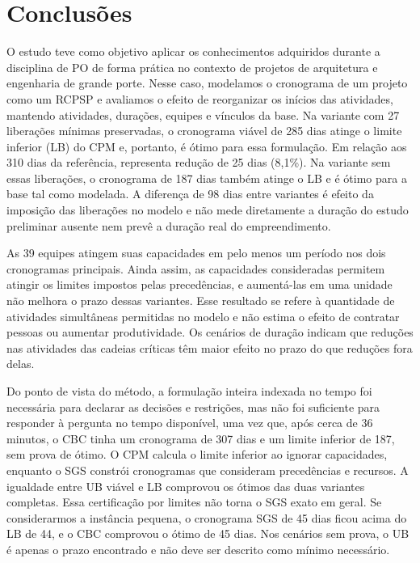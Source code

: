 
\section{Conclusões}
\label{sec:conclusoes}

O estudo teve como objetivo aplicar os conhecimentos adquiridos durante a disciplina de PO de forma prática no contexto de projetos de arquitetura e engenharia de grande porte. Nesse caso, modelamos o cronograma de um projeto como um RCPSP e avaliamos o efeito de reorganizar os inícios das atividades, mantendo atividades, durações, equipes e vínculos da base. Na variante com 27 liberações mínimas preservadas, o cronograma viável de 285
dias atinge o limite inferior (LB) do CPM e, portanto, é ótimo para essa
formulação. Em relação aos 310 dias da referência, representa redução de
25 dias (8,1\%). Na variante sem essas liberações, o cronograma de 187 dias
também atinge o LB e é ótimo para a base tal como modelada. A diferença de
98 dias entre variantes é efeito da imposição das liberações no modelo e não mede diretamente a duração do estudo preliminar ausente nem prevê a duração
real do empreendimento.

As 39 equipes atingem suas capacidades em pelo menos um período nos dois
cronogramas principais. Ainda assim, as capacidades consideradas permitem
atingir os limites impostos pelas precedências, e aumentá-las em uma
unidade não melhora o prazo dessas variantes. Esse resultado se refere à
quantidade de atividades simultâneas permitidas no modelo e não estima o
efeito de contratar pessoas ou aumentar produtividade. Os cenários de
duração indicam que reduções nas atividades das cadeias críticas têm maior
efeito no prazo do que reduções fora delas.

Do ponto de vista do método, a formulação inteira indexada no tempo foi
necessária para declarar as decisões e restrições, mas não foi suficiente para
responder à pergunta no tempo disponível, uma vez que, após cerca de 36 minutos, o CBC
tinha um cronograma de 307 dias e um limite inferior de 187, sem prova de
ótimo. O CPM calcula o limite inferior ao ignorar capacidades, enquanto o SGS
constrói cronogramas que consideram precedências e recursos. A igualdade
entre UB viável e LB comprovou os ótimos das duas variantes completas. Essa
certificação por limites não torna o SGS exato em geral. Se considerarmos a instância
pequena, o cronograma SGS de 45 dias ficou acima do LB de 44, e o CBC
comprovou o ótimo de 45 dias. Nos cenários sem prova, o UB é apenas o prazo
encontrado e não deve ser descrito como mínimo necessário.

